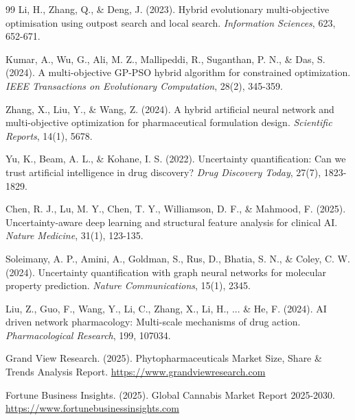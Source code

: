 \documentclass[12pt, a4paper]{article}
\begin{document}
\begin{thebibliography}{99}
Li, H., Zhang, Q., \& Deng, J. (2023).
\newblock Hybrid evolutionary multi-objective optimisation using outpost search and local search.
\newblock \textit{Information Sciences}, 623, 652-671.

Kumar, A., Wu, G., Ali, M. Z., Mallipeddi, R., Suganthan, P. N., \& Das, S. (2024).
\newblock A multi-objective GP-PSO hybrid algorithm for constrained optimization.
\newblock \textit{IEEE Transactions on Evolutionary Computation}, 28(2), 345-359.

Zhang, X., Liu, Y., \& Wang, Z. (2024).
\newblock A hybrid artificial neural network and multi-objective optimization for pharmaceutical formulation design.
\newblock \textit{Scientific Reports}, 14(1), 5678.

Yu, K., Beam, A. L., \& Kohane, I. S. (2022).
\newblock Uncertainty quantification: Can we trust artificial intelligence in drug discovery?
\newblock \textit{Drug Discovery Today}, 27(7), 1823-1829.

Chen, R. J., Lu, M. Y., Chen, T. Y., Williamson, D. F., \& Mahmood, F. (2025).
\newblock Uncertainty-aware deep learning and structural feature analysis for clinical AI.
\newblock \textit{Nature Medicine}, 31(1), 123-135.

Soleimany, A. P., Amini, A., Goldman, S., Rus, D., Bhatia, S. N., \& Coley, C. W. (2024).
\newblock Uncertainty quantification with graph neural networks for molecular property prediction.
\newblock \textit{Nature Communications}, 15(1), 2345.

Liu, Z., Guo, F., Wang, Y., Li, C., Zhang, X., Li, H., ... \& He, F. (2024).
\newblock AI driven network pharmacology: Multi-scale mechanisms of drug action.
\newblock \textit{Pharmacological Research}, 199, 107034.

Grand View Research. (2025).
\newblock Phytopharmaceuticals Market Size, Share \& Trends Analysis Report.
\newblock \url{https://www.grandviewresearch.com}

Fortune Business Insights. (2025).
\newblock Global Cannabis Market Report 2025-2030.
\newblock \url{https://www.fortunebusinessinsights.com}

\end{thebibliography}
\end{document}
